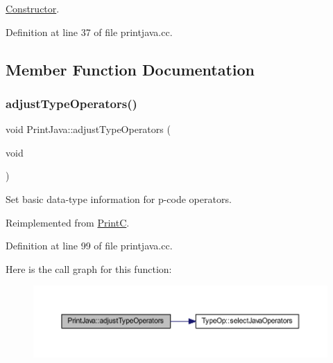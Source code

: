 \mbox{\hyperlink{class_constructor}{Constructor}}. 



Definition at line 37 of file printjava.\+cc.



\subsection{Member Function Documentation}
\mbox{\label{class_print_java_afcad564cec849b9f7d5ce1eaeb396c7d}} 
\subsubsection{\texorpdfstring{adjustTypeOperators()}{adjustTypeOperators()}}
{\footnotesize\ttfamily void Print\+Java\+::adjust\+Type\+Operators (\begin{DoxyParamCaption}\item[{void}]{ }\end{DoxyParamCaption})\hspace{0.3cm}{\ttfamily [virtual]}}



Set basic data-\/type information for p-\/code operators. 



Reimplemented from \mbox{\hyperlink{class_print_c_abbafadf839747f44eca5cb9f30d2bd3c}{PrintC}}.



Definition at line 99 of file printjava.\+cc.

Here is the call graph for this function\+:
\nopagebreak
\begin{figure}[H]
\begin{center}
\leavevmode
\includegraphics[width=350pt]{class_print_java_afcad564cec849b9f7d5ce1eaeb396c7d_cgraph}
\end{center}
\end{figure}
\mbox{\label{class_print_java_a4f4aba29ed21a74bafe52eb5cc3fe904}} 
